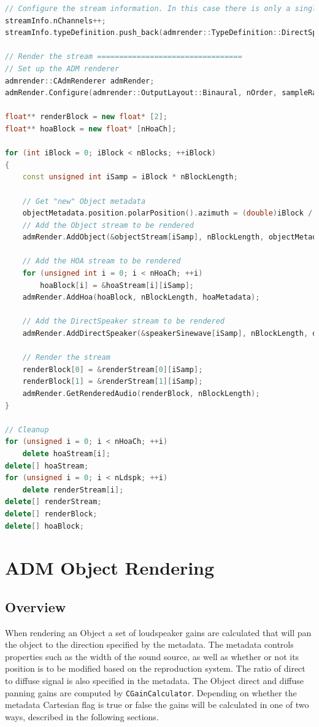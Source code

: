 \documentclass[12pt]{report}
\newcommand{\code}[1]{\texttt{#1}}
\begin{document}
\begin{lstlisting}[language=C++]
// Configure the stream information. In this case there is only a single channel stream
streamInfo.nChannels++;
streamInfo.typeDefinition.push_back(admrender::TypeDefinition::DirectSpeakers);

// Render the stream =================================
// Set up the ADM renderer
admrender::CAdmRenderer admRender;
admRender.Configure(admrender::OutputLayout::Binaural, nOrder, sampleRate, nBlockLength, streamInfo);

float** renderBlock = new float* [2];
float** hoaBlock = new float* [nHoaCh];

for (int iBlock = 0; iBlock < nBlocks; ++iBlock)
{
    const unsigned int iSamp = iBlock * nBlockLength;

    // Get "new" Object metadata
    objectMetadata.position.polarPosition().azimuth = (double)iBlock / (double)nBlocks * 360.;
    // Add the Object stream to be rendered
    admRender.AddObject(&objectStream[iSamp], nBlockLength, objectMetadata);

    // Add the HOA stream to be rendered
    for (unsigned int i = 0; i < nHoaCh; ++i)
        hoaBlock[i] = &hoaStream[i][iSamp];
    admRender.AddHoa(hoaBlock, nBlockLength, hoaMetadata);

    // Add the DirectSpeaker stream to be rendered
    admRender.AddDirectSpeaker(&speakerSinewave[iSamp], nBlockLength, directSpeakerMetadata);

    // Render the stream
    renderBlock[0] = &renderStream[0][iSamp];
    renderBlock[1] = &renderStream[1][iSamp];
    admRender.GetRenderedAudio(renderBlock, nBlockLength);
}

// Cleanup
for (unsigned i = 0; i < nHoaCh; ++i)
    delete hoaStream[i];
delete[] hoaStream;
for (unsigned i = 0; i < nLdspk; ++i)
    delete renderStream[i];
delete[] renderStream;
delete[] renderBlock;
delete[] hoaBlock;
\end{lstlisting}

\section{ADM Object Rendering}\label{AdmObject}

\subsection{Overview}

When rendering an Object a set of loudspeaker gains are calculated that will pan the object to the direction specified by the metadata.
The metadata controls properties such as the width of the sound source, as well as whether or not its position is to be modified based on the reproduction system.
The ratio of direct to diffuse signal is also specified in the metadata.
The Object direct and diffuse panning gains are computed by \code{CGainCalculator}.
Depending on whether the metadata Cartesian flag is true or false the gains will be calculated in one of two ways, described in the following sections.
\end{document}
